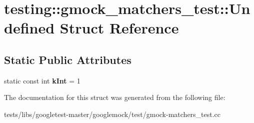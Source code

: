 \hypertarget{structtesting_1_1gmock__matchers__test_1_1Undefined}{}\section{testing\+:\+:gmock\+\_\+matchers\+\_\+test\+:\+:Undefined Struct Reference}
\label{structtesting_1_1gmock__matchers__test_1_1Undefined}
\subsection*{Static Public Attributes}
\begin{DoxyCompactItemize}
\item 
\mbox{\label{structtesting_1_1gmock__matchers__test_1_1Undefined_a59bddeb8647abbf50ee51b8ca8f0989b}} 
static const int {\bfseries k\+Int} = 1
\end{DoxyCompactItemize}


The documentation for this struct was generated from the following file\+:\begin{DoxyCompactItemize}
\item 
tests/libs/googletest-\/master/googlemock/test/gmock-\/matchers\+\_\+test.\+cc\end{DoxyCompactItemize}
